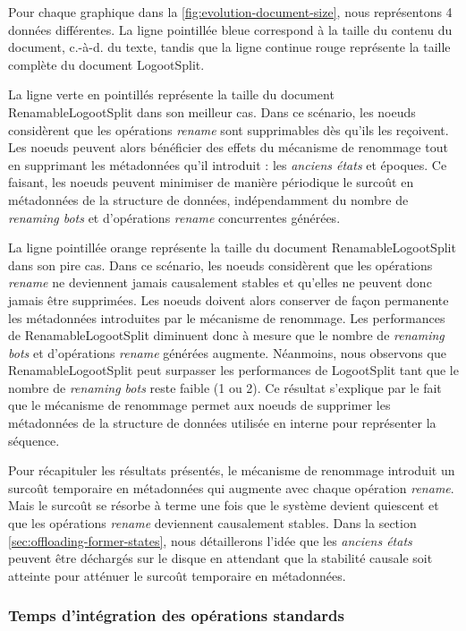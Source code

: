 \documentclass[12pt]{thesul}
\newcommand{\ie}{c.-à-d. }
\begin{document}
Pour chaque graphique dans la \autoref{fig:evolution-document-size}, nous représentons 4 données différentes.
La ligne pointillée bleue correspond à la taille du contenu du document, \ie du texte, tandis que la ligne continue rouge représente la taille complète du document LogootSplit.

La ligne verte en pointillés représente la taille du document RenamableLogootSplit dans son meilleur cas.
Dans ce scénario, les noeuds considèrent que les opérations \emph{rename} sont supprimables dès qu'ils les reçoivent.
Les noeuds peuvent alors bénéficier des effets du mécanisme de renommage tout en supprimant les métadonnées qu'il introduit : les \emph{anciens états} et époques.
Ce faisant, les noeuds peuvent minimiser de manière périodique le surcoût en métadonnées de la structure de données, indépendamment du nombre de \emph{renaming bots} et d'opérations \emph{rename} concurrentes générées.

La ligne pointillée orange représente la taille du document RenamableLogootSplit dans son pire cas.
Dans ce scénario, les noeuds considèrent que les opérations \emph{rename} ne deviennent jamais causalement stables et qu'elles ne peuvent donc jamais être supprimées.
Les noeuds doivent alors conserver de façon permanente les métadonnées introduites par le mécanisme de renommage.
Les performances de RenamableLogootSplit diminuent donc à mesure que le nombre de \emph{renaming bots} et d'opérations \emph{rename} générées augmente.
Néanmoins, nous observons que RenamableLogootSplit peut surpasser les performances de LogootSplit tant que le nombre de \emph{renaming bots} reste faible (1 ou 2).
Ce résultat s'explique par le fait que le mécanisme de renommage permet aux noeuds de supprimer les métadonnées de la structure de données utilisée en interne pour représenter la séquence.

Pour récapituler les résultats présentés, le mécanisme de renommage introduit un surcoût temporaire en métadonnées qui augmente avec chaque opération \emph{rename}.
Mais le surcoût se résorbe à terme une fois que le système devient quiescent et que les opérations \emph{rename} deviennent causalement stables.
Dans la section \autoref{sec:offloading-former-states}, nous détaillerons l'idée que les \emph{anciens états} peuvent être déchargés sur le disque en attendant que la stabilité causale soit atteinte pour atténuer le surcoût temporaire en métadonnées.

\subsubsection{Temps d'intégration des opérations standards}
\end{document}
